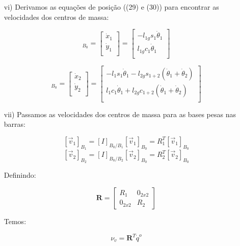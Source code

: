 \documentclass[12pt,a4paper]{article}
\begin{document}
\begin{itemize}
\begin{itemize}
	\item[vi)] Derivamos as equações de posição ((29) e (30)) para encontrar as velocidades dos centros de massa:
	
	\begin{equation}
	[\vec{v}_1]_{B_0} =
	\begin{bmatrix}
	\dot{x}_1 \\
	\dot{y}_1 \\
	\end{bmatrix}
	=
	\begin{bmatrix}
	- l_{1g} s_1 \dot{\theta}_1 \\
	l_{1g} c_1 \dot{\theta}_1 \\
	\end{bmatrix}
	\end{equation}
	
	\begin{equation}
	[\vec{v}_2]_{B_0} =
	\begin{bmatrix}
	\dot{x}_2 \\
	\dot{y}_2 \\
	\end{bmatrix}
	=
	\begin{bmatrix}
	- l_1 s_1 \dot{\theta}_1 - l_{2g} s_{1+2} ( \dot{\theta}_1 + \dot{\theta}_2)  \\
	l_1 c_1 \dot{\theta}_1 + l_{2g} c_{1+2} ( \dot{\theta}_1 + \dot{\theta}_2)  \\
	\end{bmatrix}
	\end{equation}
	
	\item[vii)] Passamos as velocidades dos centros de massa para as bases pesas nas barras:

	$$ [\vec{v}_1]_{B_1} = [I]_{B_0/B_1} [\vec{v}_1]_{B_0} = R_1^T [\vec{v}_1]_{B_0} $$
	$$ [\vec{v}_2]_{B_2} = [I]_{B_0/B_2} [\vec{v}_2]_{B_0} = R_2^T [\vec{v}_2]_{B_0} $$
	
	Definindo:
	
	
	\begin{equation}
	\mathbf{R} =
	\begin{bmatrix}
	R_1 & 0_{2x2} \\
	0_{2x2} & R_2
	\end{bmatrix}
	\end{equation}
	
	Temos:
	
	\begin{equation}
	\nu_v = \mathbf{R}^T \dot{q}^o
	\end{equation}
	

\end{itemize}
\end{itemize}
\end{document}
